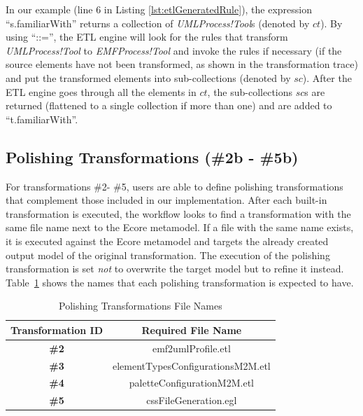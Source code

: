 In our example (line 6 in Listing \ref{lst:etlGeneratedRule}), the expression ``s.familiarWith'' returns a collection of \emph{UMLProcess!Tool}s (denoted by $ct$). By using ``::='', the ETL engine will look for the rules that transform \emph{UMLProcess!Tool} to \emph{EMFProcess!Tool} and invoke the rules if 
necessary (if the source elements have not been transformed, as shown in the transformation trace) and put the transformed elements into sub-collections 
(denoted by $sc$). 
After the ETL engine goes through all the elements in $ct$, the sub-collections $sc$s are returned (flattened to a single collection if more than one) and are added to ``t.familiarWith''.



\subsection{Polishing Transformations (\#2b - \#5b)} 
\label{sec:transformationPatches}
For transformations \#2- \#5, users are able to define polishing transformations that complement those included in our implementation. 
After each built-in transformation is executed, the workflow looks to find a transformation with the same file name next to the Ecore metamodel. 
If a file with the same name exists, it is executed against the Ecore metamodel and targets the already created output model of the original transformation. 
The execution of the polishing transformation is set \textit{not} to overwrite the target model but to refine it instead.
Table~\ref{tab:polishingTransformationsNames} shows the names that each polishing transformation is expected to have.

\begin{table}[h]
	\caption{Polishing Transformations File Names}
	\centering
	\setlength{\tabcolsep}{3.5pt} 
	\begin{tabular}{|c|c|}
		\cline{1-2}
		\textbf{Transformation ID}  & \textbf{Required File Name}\\ \hline
		\textbf{\#2} & emf2umlProfile.etl\\ \hline
		\textbf{\#3} & elementTypesConfigurationsM2M.etl\\ \hline
		\textbf{\#4} & paletteConfigurationM2M.etl\\ \hline
		\textbf{\#5} & cssFileGeneration.egl\\ \hline
		\cline{1-2}
	\end{tabular}
	\label{tab:polishingTransformationsNames}
\end{table}

